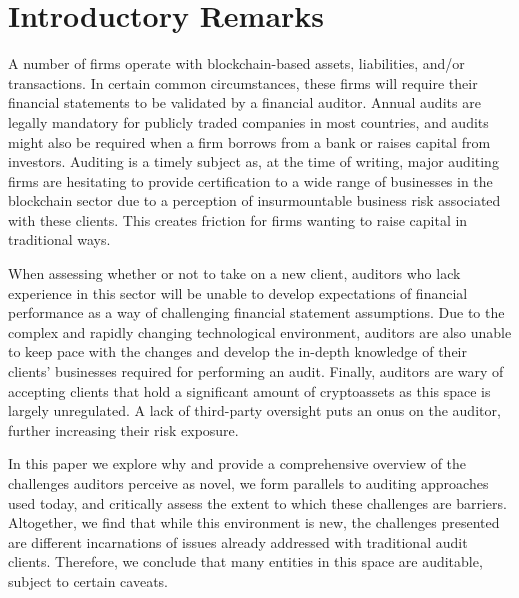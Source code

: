 \section{Introductory Remarks}

A number of firms operate with blockchain-based assets, liabilities, and/or transactions. In certain common circumstances, these firms will require their financial statements to be validated by a financial auditor. Annual audits are legally mandatory for publicly traded companies in most countries, and audits might also be required when a firm borrows from a bank or raises capital from investors. Auditing is a timely subject as, at the time of writing, major auditing firms are hesitating to provide certification to a wide range of businesses in the blockchain sector due to a perception of insurmountable business risk associated with these clients.  This creates friction for firms wanting to raise capital in traditional ways. 

When assessing whether or not to take on a new client, auditors who lack experience in this sector will be unable to develop expectations of financial performance as a way of challenging financial statement assumptions. Due to the complex and rapidly changing technological environment, auditors are also unable to keep pace with the changes and develop the in-depth knowledge of their clients'  businesses required for performing an audit. Finally, auditors are wary of accepting clients that hold a significant amount of cryptoassets as this space is largely unregulated. A lack of third-party oversight puts an onus on the auditor, further increasing their risk exposure.  

In this paper we explore why and provide a comprehensive overview of the challenges auditors perceive as novel, we form parallels to auditing approaches used today, and critically assess the extent to which these challenges are barriers. Altogether, we find that while this environment is new, the challenges presented are different incarnations of issues already addressed with traditional audit clients. Therefore, we conclude that many entities in this space are auditable, subject to certain caveats. 


